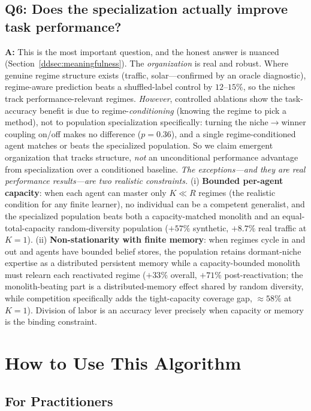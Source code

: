 \documentclass[11pt,a4paper]{article}
\theoremstyle{definition}
\theoremstyle{plain}
\begin{document}
\subsection{Q6: Does the specialization actually improve task performance?}

\textbf{A:} This is the most important question, and the honest answer is nuanced
(Section~\ref{ddsec:meaningfulness}). The \emph{organization} is real and robust.
Where genuine regime structure exists (traffic, solar---confirmed by an oracle
diagnostic), regime-aware prediction beats a shuffled-label control by $12$--$15\%$,
so the niches track performance-relevant regimes. \emph{However}, controlled
ablations show the task-accuracy benefit is due to regime-\emph{conditioning}
(knowing the regime to pick a method), not to population specialization
specifically: turning the niche$\to$winner coupling on/off makes no difference
($p = 0.36$), and a single regime-conditioned agent matches or beats the
specialized population. So we claim emergent organization that tracks structure,
\emph{not} an unconditional performance advantage from specialization over a
conditioned baseline. \emph{The exceptions---and they are real performance
results---are two realistic constraints.} (i) \textbf{Bounded per-agent
capacity}: when each agent can master only $K \ll R$ regimes (the realistic
condition for any finite learner), no individual can be a competent generalist,
and the specialized population beats both a capacity-matched monolith and an
equal-total-capacity random-diversity population ($+57\%$ synthetic, $+8.7\%$ real
traffic at $K{=}1$). (ii) \textbf{Non-stationarity with finite memory}: when
regimes cycle in and out and agents have bounded belief stores, the population
retains dormant-niche expertise as a distributed persistent memory while a
capacity-bounded monolith must relearn each reactivated regime ($+33\%$ overall,
$+71\%$ post-reactivation; the monolith-beating part is a distributed-memory
effect shared by random diversity, while competition specifically adds the
tight-capacity coverage gap, $\approx 58\%$ at $K{=}1$). Division of labor is an
accuracy lever precisely when capacity or memory is the binding constraint.

\section{How to Use This Algorithm}

\subsection{For Practitioners}
\end{document}
